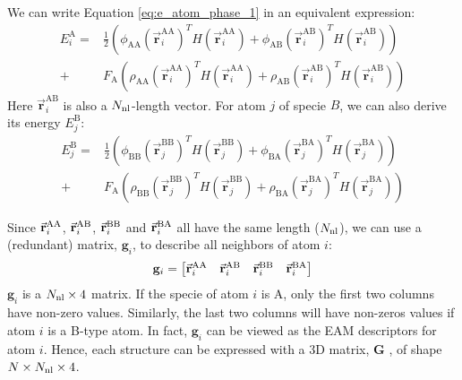 \documentclass[prb,reprint]{revtex4-2}
\begin{document}
We can write Equation \ref{eq:e_atom_phase_1} in an equivalent expression:
\begin{align}
E_{i}^{\mathrm{A}} 
\label{eq:e_atom_A}
= &
\frac{1}{2}\left( 
    \phi_{\mathrm{AA}}(\vec{\mathbf{r}}_{i}^{\mathrm{AA}})^T
    H(\vec{\mathbf{r}}_{i}^{\mathrm{AA}}) +
    \phi_{\mathrm{AB}}(\vec{\mathbf{r}}_{i}^{\mathrm{AB}})^T
    H(\vec{\mathbf{r}}_{i}^{\mathrm{AB}})
\right) \nonumber \\
+ &
F_{\mathrm{A}}\left( 
    \rho_{\mathrm{AA}}(\vec{\mathbf{r}}_{i}^{\mathrm{AA}})^T
    H(\vec{\mathbf{r}}_{i}^{\mathrm{AA}}) +
    \rho_{\mathrm{AB}}(\vec{\mathbf{r}}_{i}^{\mathrm{AB}})^T
    H(\vec{\mathbf{r}}_{i}^{\mathrm{AB}})
\right)
\end{align}
Here $\vec{\mathbf{r}}_{i}^{\mathrm{AB}}$ is also a $N_{\mathrm{nl}}$-length vector. For 
atom $j$ of specie $B$, we can also derive its energy $E^{\mathrm{B}}_{j}$:
\begin{align}
E_{j}^{\mathrm{B}}
\label{eq:e_atom_B}
= &
\frac{1}{2}\left( 
    \phi_{\mathrm{BB}}(\vec{\mathbf{r}}_{j}^{\mathrm{BB}})^T
    H(\vec{\mathbf{r}}_{j}^{\mathrm{BB}}) +
    \phi_{\mathrm{BA}}(\vec{\mathbf{r}}_{j}^{\mathrm{BA}})^T
    H(\vec{\mathbf{r}}_{j}^{\mathrm{BA}})
\right) \nonumber \\
+ &
F_{\mathrm{A}}\left( 
    \rho_{\mathrm{BB}}(\vec{\mathbf{r}}_{j}^{\mathrm{BB}})^T
    H(\vec{\mathbf{r}}_{j}^{\mathrm{BB}}) +
    \rho_{\mathrm{BA}}(\vec{\mathbf{r}}_{j}^{\mathrm{BA}})^T
    H(\vec{\mathbf{r}}_{j}^{\mathrm{BA}})
\right)
\end{align}

Since $\vec{\mathbf{r}}_{i}^{\mathrm{AA}}$, $\vec{\mathbf{r}}_{i}^{\mathrm{AB}}$, $\vec{\mathbf{r}}_{i}^{\mathrm{BB}}$ and $\vec{\mathbf{r}}_{i}^{\mathrm{BA}}$ all have the same length ($N_{\mathrm{nl}}$), 
we can use a (redundant) matrix, $\mathbf{g}_{i}$, to describe all neighbors of 
atom $i$:
\begin{equation}
\mathbf{g}_i = \begin{bmatrix}
    \vec{\mathbf{r}}_{i}^{\mathrm{AA}} & \vec{\mathbf{r}}_{i}^{\mathrm{AB}} & \vec{\mathbf{r}}_{i}^{\mathrm{BB}} & \vec{\mathbf{r}}_{i}^{\mathrm{BA}} \\
\end{bmatrix}
\end{equation}
$\mathbf{g}_i$ is a $N_{\mathrm{nl}} \times 4$ matrix. If the specie of atom $i$ is A, only
the first two columns have non-zero values. Similarly, the last two columns will
have non-zeros values if atom $i$ is a B-type atom. In fact, $\mathbf{g}_i$ can
be viewed as the EAM descriptors for atom $i$. Hence, each structure can be 
expressed with a 3D matrix, $\mathbf{G}$ , of shape $N \times N_{\mathrm{nl}} \times 4$.
\end{document}
